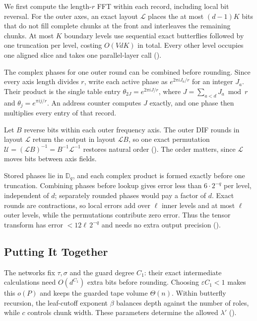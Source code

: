 \documentclass[11pt]{article}
\theoremstyle{definition}
\newcommand{\Disk}{\mathbb{D}}
\newcommand{\eps}{\varepsilon}
\begin{document}
We first compute the length-$r$ FFT within each record, including local bit reversal.
For the outer axes, an exact layout $\mathcal L$ places the at most $(d-1)K$ bits that do not fill complete chunks at the front and interleaves the remaining chunks.
At most $K$ boundary levels use sequential exact butterflies followed by one truncation per level, costing $O(VdK)$ in total.
Every other level occupies one aligned slice and takes one parallel-layer call ().

The complex phases for one outer round can be combined before rounding.
Since every axis length divides $r$, write each active phase as $e^{2\pi iJ_a/r}$ for an integer $J_a$.
Their product is the single table entry $\theta_{2J}=e^{2\pi iJ/r}$, where
$J=\sum_{a<d}J_a\bmod r$ and $\theta_j=e^{\pi ij/r}$.
An address counter computes $J$ exactly, and one phase then multiplies every entry of that record.

Let $B$ reverse bits within each outer frequency axis.
The outer DIF rounds in layout $\mathcal L$ return the output in layout $\mathcal LB$, so one exact permutation
$\mathcal U=(\mathcal LB)^{-1}=B^{-1}\mathcal L^{-1}$ restores natural order ().
The order matters, since $\mathcal L$ moves bits between axis fields.

Stored phases lie in $\Disk_q$, and each complex product is formed exactly before one truncation.
Combining phases before lookup gives error less than $6\cdot2^{-q}$ per level, independent of $d$; separately rounded phases would pay a factor of $d$.
Exact rounds are contractions, so local errors add over $\ell$ inner levels and at most $\ell$ outer levels, while the permutations contribute zero error.
Thus the tensor transform has error $<12\ell\,2^{-q}$ and needs no extra output precision ().

\subsection{Putting It Together}

The networks fix $\tau,\sigma$ and the guard degree $C_1$: their exact intermediate calculations need $O(d^{C_1})$ extra bits before rounding.
Choosing $\eps C_1<1$ makes this $o(P)$ and keeps the guarded tape volume $\Theta(n)$.
Within butterfly recursion, the leaf-cutoff exponent $\beta$ balances depth against the number of roles, while $c$ controls chunk width.
These parameters determine the allowed $\lambda'$ ().
\end{document}
